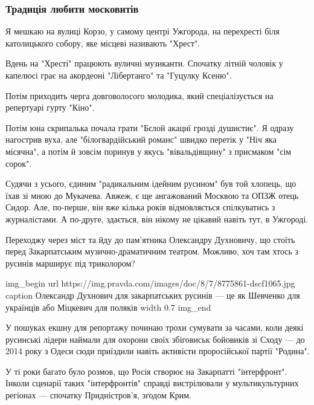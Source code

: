  
 
 

\subsubsection{Традиція любити московитів}
\label{sec:11_11_2020.news.ua.pravda.1.rusynstvo.moskovity_love}

Я мешкаю на вулиці Корзо, у самому центрі Ужгорода, на перехресті біля
католицького собору, яке місцеві називають "Хрест".

Вдень на "Хресті" працюють вуличні музиканти. Спочатку літній чоловік у
капелюсі грає на акордеоні "Лібертанго" та "Гуцулку Ксеню".

Потім приходить черга довговолосого молодика, який спеціалізується на
репертуарі гурту "Кіно".

Потім юна скрипалька почала грати "Бєлой акациї грозді душистиє". Я одразу
нагострив вуха, але "білогвардійський романс" швидко перетік у "Ніч яка
місячна", а потім й зовсім поринув у якусь "вівальдівщину" з присмаком "сім
сорок".

Судячи з усього, єдиним "радикальним ідейним русином" був той хлопець, що їхав
зі мною до Мукачева. Авжеж, є ще ангажований Москвою та ОПЗЖ отець Сидор. Але,
по-перше, він вже кілька років відмовляється спілкуватись з журналістами. А
по-друге, здається, він нікому не цікавий навіть тут, в Ужгороді.

Переходжу через міст та йду до пам’ятника Олександру Духновичу, що стоїть перед
Закарпатським музично-драматичним театром. Можливо, хоч там хтось з русинів
марширує під триколором?

\ifcmt
img_begin 
	url https://img.pravda.com/images/doc/8/7/8775861-dscf1065.jpg
	caption Олександр Духнович для закарпатських русинів --- це як Шевченко для українців або Міцкевич для поляків
	width 0.7
img_end
\fi

У пошуках екшну для репортажу починаю трохи сумувати за часами, коли деякі
русинські лідери наймали для охорони своїх збіговиськ бойовиків зі Сходу --- до
2014 року з Одеси сюди приїздили навіть активісти проросійської партії
"Родина".

У ті роки багато було розмов, що Росія створює на Закарпатті "інтерфронт".
Інколи сценарії таких "інтерфронтів" справді вистрілювали у мультикультурних
регіонах --- спочатку Придністров’я, згодом Крим.

